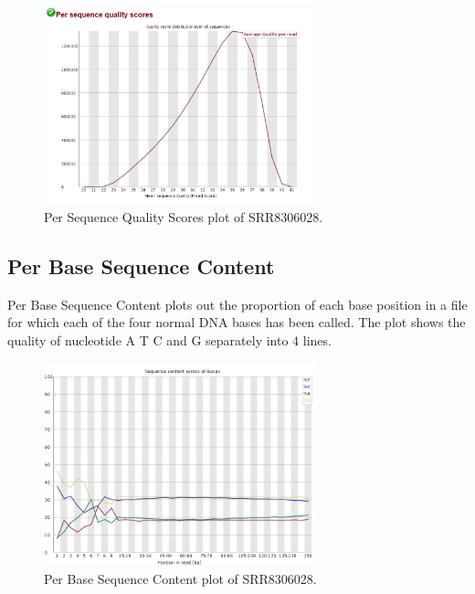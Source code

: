 \documentclass[
  letterpaper,
  DIV=11,
  numbers=noendperiod]{scrreprt}
\begin{document}
\begin{figure}

{\centering \includegraphics[width=0.7\textwidth,height=\textheight]{./assets/23_fqc_per_seq_qual.png}

}

\caption{Per Sequence Quality Scores plot of SRR8306028.}

\end{figure}

\hypertarget{per-base-sequence-content}{%
\subsection{Per Base Sequence Content}\label{per-base-sequence-content}}

Per Base Sequence Content plots out the proportion of each base position
in a file for which each of the four normal DNA bases has been called.
The plot shows the quality of nucleotide A T C and G separately into 4
lines.

\begin{figure}

{\centering \includegraphics[width=0.7\textwidth,height=\textheight]{./assets/24_fqc_per_base_seq_content.png}

}

\caption{Per Base Sequence Content plot of SRR8306028.}

\end{figure}
\end{document}
